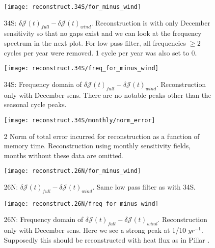 \documentclass[a4paper,11pt]{article}
\begin{document}
   \begin{figure}
    \centering
    \texttt{[image: reconstruct.34S/for\_minus\_wind]}
    \caption{34S: $\delta\mathcal{J}(t)_{full} - \delta\mathcal{J}(t)_{wind}$. Reconstruction is with only December sensitivity so that no gaps exist and we can look at the frequency spectrum in the next plot. For low pass filter, all frequencies $\geq2$ cycles per year were removed. 1 cycle per year was also set to 0. }
    \label{fig:windRecError}
   \end{figure}

   \begin{figure}
    \centering
    \texttt{[image: reconstruct.34S/freq\_for\_minus\_wind]}
    \caption{34S: Frequency domain of $\delta\mathcal{J}(t)_{full} - \delta\mathcal{J}(t)_{wind}$. Reconstruction only with December sens. There are no notable peaks other than the seasonal cycle peaks.}
    \label{fig:freqWindRecError}
   \end{figure}

   \begin{figure}
    \centering
    \texttt{[image: reconstruct.34S/monthly/norm\_error]}
    \caption{2 Norm of total error incurred for reconstruction as a function of memory time. Reconstruction using monthly sensitivity fields, months without these data are omitted.}
    \label{fig:reconstructError}
   \end{figure}

   \begin{figure}
    \centering
    \texttt{[image: reconstruct.26N/for\_minus\_wind]}
    \caption{26N: $\delta\mathcal{J}(t)_{full} - \delta\mathcal{J}(t)_{wind}$. Same low pass filter as with 34S.}
    \label{fig:windRecError26N}
   \end{figure}

   \begin{figure}
    \centering
    \texttt{[image: reconstruct.26N/freq\_for\_minus\_wind]}
    \caption{26N: Frequency domain of $\delta\mathcal{J}(t)_{full} - \delta\mathcal{J}(t)_{wind}$. Reconstruction only with December sens. Here we see a strong peak at 1/10 $yr^{-1}$. Supposedly this should be reconstructed with heat flux as in Pillar \cite{pillar}.}
    \label{fig:freqWindRecError26N}
   \end{figure}
\end{document}
